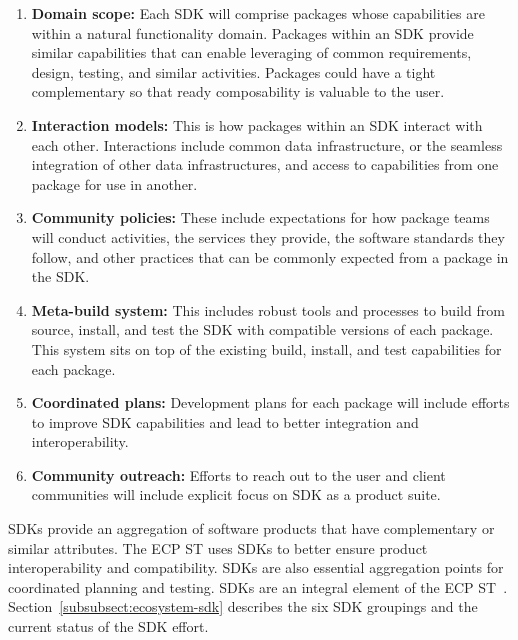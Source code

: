 \begin{enumerate}
	\item \textbf{Domain scope:} Each SDK will comprise packages whose capabilities are within a natural functionality domain. Packages within an SDK provide similar capabilities that can enable leveraging of common requirements, design, testing, and similar activities. Packages could have a tight complementary so that ready composability is valuable to the user.
	\item \textbf{Interaction models:} This is how packages within an SDK interact with each other. Interactions include common data infrastructure, or the seamless integration of other data infrastructures, and access to capabilities from one package for use in another.
	\item \textbf{Community policies:} These include expectations for how package teams will conduct activities, the services they provide, the software standards they follow, and other practices that can be commonly expected from a package in the SDK.
	\item \textbf{Meta-build system:} This includes robust tools and processes to build from source, install, and test the SDK with compatible versions of each package. This system sits on top of the existing build, install, and test capabilities for each package.
	\item \textbf{Coordinated plans:} Development plans for each package will include efforts to improve SDK capabilities and lead to better integration and interoperability.
	\item \textbf{Community outreach:} Efforts to reach out to the user and client communities will include explicit focus on SDK as a product suite.
\end{enumerate}
	
SDKs provide an aggregation of software products that have complementary or similar attributes. The ECP ST uses SDKs to better ensure product interoperability and compatibility.  SDKs are also essential aggregation points for coordinated planning and testing. SDKs are an integral element of the ECP ST~\cite{Heroux-SDK-Podcast}.  Section~\ref{subsubsect:ecosystem-sdk} describes the six SDK groupings and the current status of the SDK effort.

